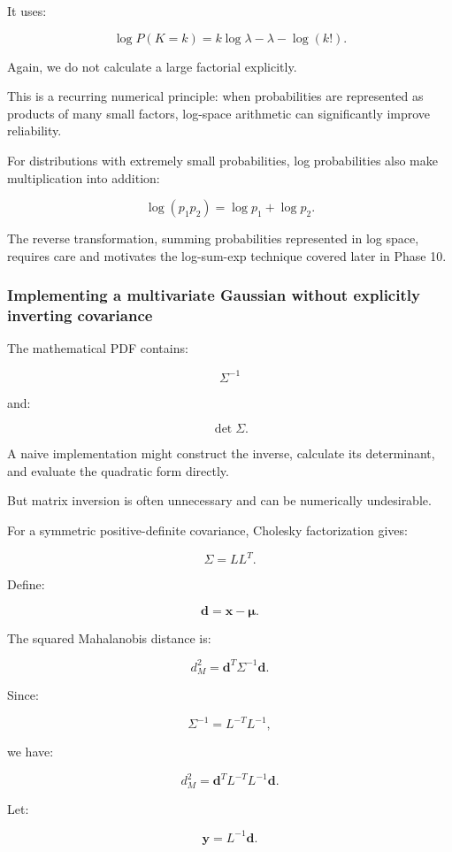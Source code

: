 It uses:

\[
 \log P(K=k) = k\log\lambda-\lambda-\log(k!).
\]

Again, we do not calculate a large factorial explicitly.

This is a recurring numerical principle: when probabilities are represented as products of many small factors, log-space arithmetic can significantly improve reliability.

For distributions with extremely small probabilities, log probabilities also make multiplication into addition:

\[
 \log(p_1p_2)=\log p_1+\log p_2.
\]

The reverse transformation, summing probabilities represented in log space, requires care and motivates the log-sum-exp technique covered later in Phase 10.

\subsubsection{Implementing a multivariate Gaussian without explicitly inverting covariance}\label{implementing-a-multivariate-gaussian-without-explicitly-inverting-covariance}

The mathematical PDF contains:

\[
 \Sigma^{-1}
\]

and:

\[
 \det\Sigma.
\]

A naive implementation might construct the inverse, calculate its determinant, and evaluate the quadratic form directly.

But matrix inversion is often unnecessary and can be numerically undesirable.

For a symmetric positive-definite covariance, Cholesky factorization gives:

\[
 \boxed{\Sigma=LL^T}.
\]

Define:

\[
 \mathbf d=\mathbf x-\boldsymbol\mu.
\]

The squared Mahalanobis distance is:

\[
 d_M^2=\mathbf d^T\Sigma^{-1}\mathbf d.
\]

Since:

\[
 \Sigma^{-1}=L^{-T}L^{-1},
\]

we have:

\[
 d_M^2= \mathbf d^TL^{-T}L^{-1}\mathbf d.
\]

Let:

\[
 \mathbf y=L^{-1}\mathbf d.
\]

